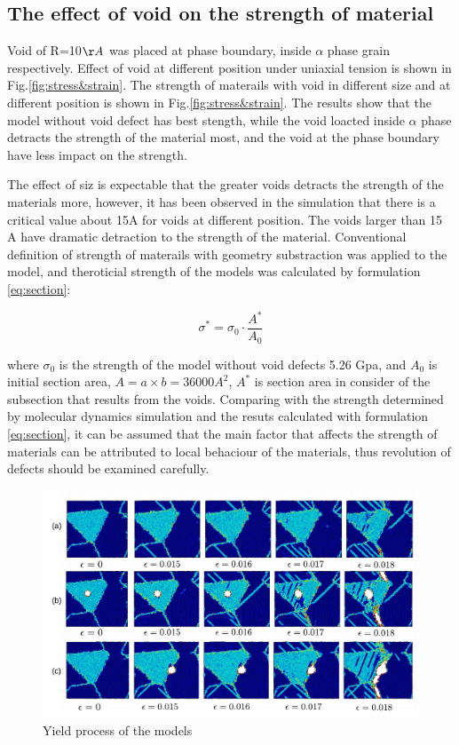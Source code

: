 \documentclass[journal,article,submit,moreauthors,pdftex,10pt,a4paper]{Definitions/mdpi}
\begin{document}
	 
\subsection{The effect of void on the strength of material}

Void of R=10$\AA$ was placed at phase boundary, inside $\alpha$ phase grain respectively. Effect of void at different position under uniaxial tension is shown in Fig.\ref{fig:stress&strain}. The strength of materails with void in different size and at different position is shown in Fig.\ref{fig:stress&strain}. The results show that the model without void defect has best stength, while the void loacted inside $\alpha$ phase detracts the strength of the material most, and the void at the phase boundary have less impact on the strength.
	
The effect of siz is expectable that the greater voids detracts the strength of the materials more, however, it has been observed in the simulation that there is a critical value about 15A for voids at different position. The voids larger than 15 A have dramatic detraction to the strength of the material. Conventional definition of strength of materails with geometry substraction was applied to the model, and theroticial strength of the models was calculated by formulation \ref{eq:section}:
	
	\begin{equation} \label{eq:section} 
	\sigma^* = \sigma_0 \cdot \frac{A^*}{A_0}
	\end{equation}
	
where $\sigma_0$ is the strength of the model without void defects 5.26 Gpa, and $A_0$ is initial section area, $ A = a\times b = 36000 A^2$, $A^* $ is section area in consider of the subsection that results from the voids. Comparing with the strength determined by molecular dynamics simulation and the resuts calculated with formulation \ref{eq:section}, it can be assumed that the main factor that affects the strength of materials can be attributed to local behaciour of the materials, thus revolution of defects should be examined carefully.

	
\begin{figure}[ht]
	\centering
	\includegraphics[width=1\linewidth]{"img/fracture3"}
	\caption{Yield process of the models}
	\label{fig:yield}
\end{figure}
\end{document}
